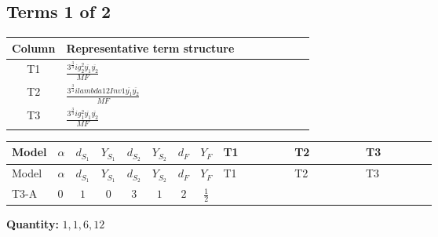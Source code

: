 \documentclass[8pt]{article}
\begin{document}
\begin{landscape}
\subsection*{Terms 1 of 2}
\begin{center}
\begin{tabular}{@{}c >{\raggedright\arraybackslash}p{0.82\linewidth}@{}}
\toprule
Column & Representative term structure \\
\midrule
T1 & \(\displaystyle \frac{3^{\frac{3}{4}} i g_{2}^{2} \overline{y_{1}} \overline{y_{2}}}{MF}\) \\
\midrule
T2 & \(\displaystyle \frac{3^{\frac{3}{4}} i lambda12Inv1 \overline{y_{1}} \overline{y_{2}}}{MF}\) \\
\midrule
T3 & \(\displaystyle \frac{3^{\frac{3}{4}} i g_{1}^{2} \overline{y_{1}} \overline{y_{2}}}{MF}\) \\
\midrule
\bottomrule
\end{tabular}
\end{center}
\smallskip
\tiny
\begin{longtable}{@{}llcccccc >{\raggedright\arraybackslash}p{0.21\linewidth} >{\raggedright\arraybackslash}p{0.21\linewidth} >{\raggedright\arraybackslash}p{0.21\linewidth}@{}}
\toprule
Model & $\alpha$ & $d_{S_1}$ & $Y_{S_1}$ & $d_{S_2}$ & $Y_{S_2}$ & $d_F$ & $Y_F$ & T1 & T2 & T3 \\
\midrule
\endfirsthead
\toprule
Model & $\alpha$ & $d_{S_1}$ & $Y_{S_1}$ & $d_{S_2}$ & $Y_{S_2}$ & $d_F$ & $Y_F$ & T1 & T2 & T3 \\
\midrule
\endhead
T3-A & $0$ & $1$ & $0$ & $3$ & $1$ & $2$ & $\frac{1}{2}$ & \scriptsize\adjustbox{max width=\linewidth}{$\begin{gathered} - \frac{17 \cdot 3^{\frac{3}{4}} i g_{2}^{2} \overline{y_{1}} \overline{y_{2}}}{24 MF}\end{gathered}$} & \scriptsize\adjustbox{max width=\linewidth}{$\begin{gathered} - \frac{3^{\frac{3}{4}} i lambda12Inv1 \overline{y_{1}} \overline{y_{2}}}{6 MF}\end{gathered}$} & \scriptsize\adjustbox{max width=\linewidth}{$\begin{gathered} - \frac{3^{\frac{3}{4}} i g_{1}^{2} \overline{y_{1}} \overline{y_{2}}}{8 MF}\end{gathered}$} \\
\midrule
\bottomrule
\end{longtable}
\clearpage
\noindent\textbf{Quantity: }$\mathrm{1,1,6,12}$\par\smallskip

\end{landscape}
\end{document}
